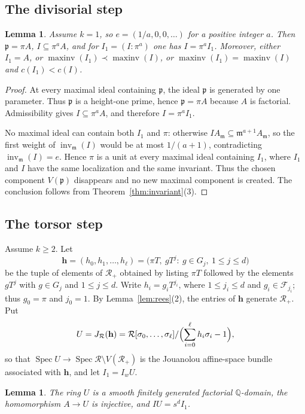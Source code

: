 \documentclass[11pt]{amsart}
\numberwithin{equation}{section}
\newtheorem{lemma}[theorem]{Lemma}
\theoremstyle{definition}
\newcommand{\Q}{\mathbb{Q}}
\newcommand{\fm}{\mathfrak{m}}
\newcommand{\fp}{\mathfrak{p}}
\newcommand{\cF}{\mathcal{F}}
\newcommand{\cR}{\mathcal{R}}
\DeclareMathOperator{\Spec}{Spec}
\DeclareMathOperator{\inv}{inv}
\DeclareMathOperator{\maxinv}{maxinv}
\begin{document}
\subsection{The divisorial step}

\begin{lemma}\label{lem:divisorial}
Assume $k=1$, so $e=(1/a,0,0,\ldots)$ for a positive integer $a$. Then $\fp=\pi A$, $I\subseteq\pi^aA$, and for $I_1=(I:\pi^a)$ one has $I=\pi^aI_1$. Moreover, either $I_1=A$, or $\maxinv(I_1)\prec\maxinv(I)$, or $\maxinv(I_1)=\maxinv(I)$ and $c(I_1)<c(I)$.
\end{lemma}

\begin{proof}
At every maximal ideal containing $\fp$, the ideal $\fp$ is generated by one parameter. Thus $\fp$ is a height-one prime, hence $\fp=\pi A$ because $A$ is factorial. Admissibility gives $I\subseteq\pi^aA$, and therefore $I=\pi^aI_1$.

No maximal ideal can contain both $I_1$ and $\pi$: otherwise $IA_\fm\subseteq\fm^{a+1}A_\fm$, so the first weight of $\inv_\fm(I)$ would be at most $1/(a+1)$, contradicting $\inv_\fm(I)=e$. Hence $\pi$ is a unit at every maximal ideal containing $I_1$, where $I_1$ and $I$ have the same localization and the same invariant. Thus the chosen component $V(\fp)$ disappears and no new maximal component is created. The conclusion follows from Theorem~\ref{thm:invariant}(3).
\end{proof}

\subsection{The torsor step}
Assume $k\ge2$. Let
\[
  \mathbf h=(h_0,h_1,\ldots,h_\ell)=\bigl(\pi T,\ gT^j:\ g\in G_j,\ 1\le j\le d\bigr)
\]
be the tuple of elements of $\cR_+$ obtained by listing $\pi T$ followed by the elements $gT^j$ with $g\in G_j$ and $1\le j\le d$. Write $h_i=g_iT^{j_i}$, where $1\le j_i\le d$ and $g_i\in\cF_{j_i}$; thus $g_0=\pi$ and $j_0=1$. By Lemma~\ref{lem:rees}(2), the entries of $\mathbf h$ generate $\cR_+$. Put
\[
  U=J_\cR(\mathbf h)=\cR[\sigma_0,\ldots,\sigma_\ell]/\Bigl(\sum_{i=0}^\ell h_i\sigma_i-1\Bigr),
\]
so that $\Spec U\to\Spec \cR\setminus V(\cR_+)$ is the Jouanolou affine-space bundle associated with $\mathbf h$, and let $I_1=I_wU$.

\begin{lemma}\label{lem:torsor}
The ring $U$ is a smooth finitely generated factorial $\Q$-domain, the homomorphism $A\to U$ is injective, and $IU=s^dI_1$.
\end{lemma}
\end{document}
